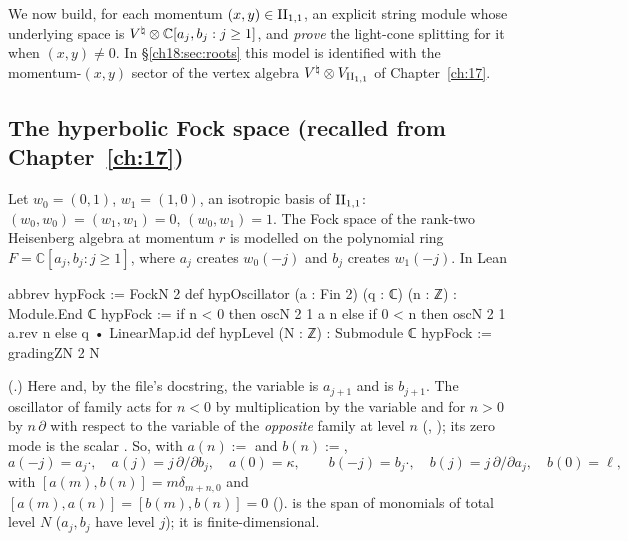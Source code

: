 We now build, for each momentum $(x,y)\in\mathrm{II}_{1,1}$, an explicit string module whose underlying space is
${V^{\natural}}\otimes\mathbb C[a_j,b_j:j\ge1]$, and \emph{prove} the light-cone splitting for it when
$(x,y)\neq0$.  In \S\ref{ch18:sec:roots} this model is identified with the momentum-$(x,y)$ sector of the
vertex algebra ${V^{\natural}}\otimes V_{\mathrm{II}_{1,1}}$ of Chapter~\ref{ch:17}.

\subsection{The hyperbolic Fock space (recalled from Chapter~\ref{ch:17})}

Let $w_0=(0,1)$, $w_1=(1,0)$, an isotropic basis of $\mathrm{II}_{1,1}$: $(w_0,w_0)=(w_1,w_1)=0$, $(w_0,w_1)=1$.  The Fock
space of the rank-two Heisenberg algebra at momentum $r$ is modelled on the polynomial ring
$F=\mathbb C[a_j,b_j:j\ge1]$, where $a_j$ creates $w_0(-j)$ and $b_j$ creates $w_1(-j)$.  In Lean
\begin{leancode}
abbrev hypFock := FockN 2
def hypOscillator (a : Fin 2) (q : ℂ) (n : ℤ) : Module.End ℂ hypFock :=
  if n < 0 then oscN 2 1 a n
  else if 0 < n then oscN 2 1 a.rev n
  else q • LinearMap.id
def hypLevel (N : ℤ) : Submodule ℂ hypFock := gradingZN 2 N
\end{leancode}
(.)  Here 
and, by the file's docstring, the variable  is $a_{j+1}$ and  is $b_{j+1}$.  The
oscillator of family  acts for $n<0$ by multiplication by the variable  and for
$n>0$ by $n\,\partial$ with respect to the variable of the \emph{opposite} family  at level
$n$ (, ); its zero mode is the
scalar .  So, with $a(n):=$ and $b(n):=$,
\begin{equation*}
  a(-j)=a_j\cdot,\quad a(j)=j\,\partial/\partial b_j,\quad a(0)=\kappa,\qquad
  b(-j)=b_j\cdot,\quad b(j)=j\,\partial/\partial a_j,\quad b(0)=\ell,
\end{equation*}
with $[a(m),b(n)]=m\delta_{m+n,0}$ and $[a(m),a(n)]=[b(m),b(n)]=0$ ().
 is the span of monomials of total level $N$ ($a_j,b_j$ have level $j$); it is
finite-dimensional.

